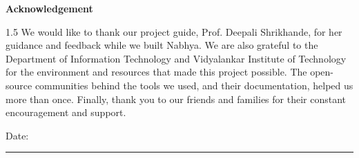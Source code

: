 \cleardoublepage
\thispagestyle{empty}
\begin{center}{\Huge\textbf{Acknowledgement}}\end{center}
\vspace{0.4in}
\begin{spacing}{1.5}
We would like to thank our project guide, Prof. Deepali Shrikhande, for her guidance and feedback while we built Nabhya. We are also grateful to the Department of Information Technology and Vidyalankar Institute of Technology for the environment and resources that made this project possible. The open-source communities behind the tools we used, and their documentation, helped us more than once. Finally, thank you to our friends and families for their constant encouragement and support.
\end{spacing}
\vspace{0.6in}
\noindent Date: \rule{5cm}{0.4pt}

\onehalfspacing

